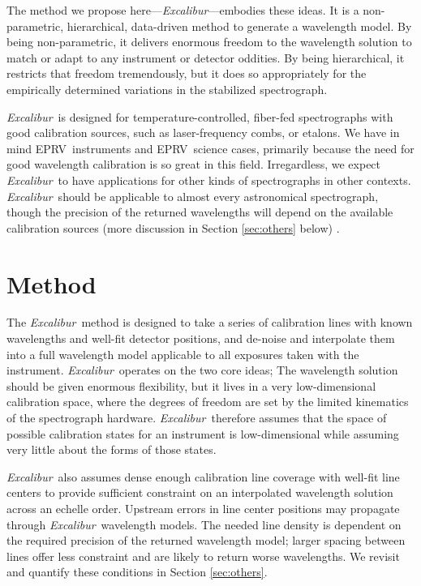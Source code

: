 \documentclass[modern]{aastex63}
\newcommand{\project}[1]{\textsl{#1}}
\newcommand{\name}{\project{Excalibur}}
\newcommand{\acronym}[1]{{\small{#1}}}
\newcommand{\eprv}{\acronym{EPRV}}
\begin{document}
The method we propose here---\name---embodies these ideas.
It is a non-parametric, hierarchical, data-driven method to generate a wavelength model.  By being non-parametric, it delivers enormous freedom to the wavelength solution to match or adapt to any instrument or detector oddities.  By being hierarchical, it restricts that freedom tremendously, but it does so appropriately for the empirically determined variations in the stabilized spectrograph.

\name\ is designed for temperature-controlled, fiber-fed spectrographs with good calibration sources, such as laser-frequency combs, or etalons.  We have in mind \eprv\ instruments and \eprv\ science cases, primarily because the need for good wavelength calibration is so great in this field.  Irregardless, we expect \name\ to have applications for other kinds of spectrographs in other contexts.  \name\ should be applicable to almost every astronomical spectrograph, though the precision of the returned wavelengths will depend on the available calibration sources (more discussion in Section \ref{sec:others} below) .


\section{Method} \label{sec:method}
The \name\ method is designed to take a series of calibration lines with known wavelengths and well-fit detector positions, and de-noise and interpolate them into a full wavelength model applicable to all exposures taken with the instrument.  \name\ operates on the two core ideas; The wavelength solution should be given enormous flexibility, but it lives in a very low-dimensional calibration space, where the degrees of freedom are set by the limited kinematics of the spectrograph hardware.  \name\ therefore assumes that the space of possible calibration states for an instrument is low-dimensional while assuming very little about the forms of those states.

\name\ also assumes dense enough calibration line coverage with well-fit line centers to provide sufficient constraint on an interpolated wavelength solution across an echelle order.  Upstream errors in line center positions may propagate through \name\ wavelength models.  The needed line density is dependent on the required precision of the returned wavelength model; larger spacing between lines offer less constraint and are likely to return worse wavelengths.  We revisit and quantify these conditions in Section \ref{sec:others}.
\end{document}
